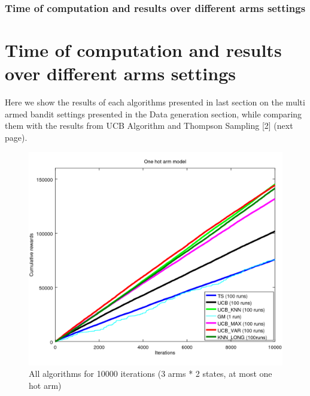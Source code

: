 \documentclass[french]{beamer}
\begin{document}
\begin{frame}
	\frametitle{Time of computation and results over different arms settings}
	
	\section{Time of computation and results over different arms settings}
	
	Here we show the results of each algorithms presented in last section on the multi
	armed bandit settings presented in the Data generation section, while comparing them
	with the results from UCB Algorithm and Thompson Sampling [2] (next page).
	
	\begin{figure}[h]
		\begin{center}
			\includegraphics[width=1.0\textwidth]{all_10000it.png}
		\end{center}
		\caption{All algorithms for 10000 iterations (3 arms * 2 states, at most one hot arm)}
	\end{figure}
	

\end{frame}
\end{document}
